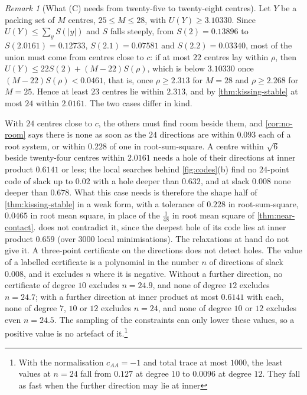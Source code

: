 \documentclass[11pt,reqno]{amsart}
\renewcommand{\_}{\origunderscore\allowbreak}
\numberwithin{equation}{section}
\theoremstyle{plain}
\theoremstyle{definition}
\theoremstyle{remark}
\newtheorem{remark}[thm]{Remark}
\begin{document}
\begin{remark}[What (C) needs from twenty-five to twenty-eight centres]\label{rem:what-c-needs}
Let $Y$ be a packing set of $M$ centres, $25\le M\le28$, with
$U(Y)\ge3.10330$. Since $U(Y)\le\sum_yS(|y|)$ and $S$ falls steeply,
from $S(2)=0.13896$ to $S(2.0161)=0.12733$, $S(2.1)=0.07581$ and
$S(2.2)=0.03340$, most of the union must come from centres close to $c$: if
at most $22$ centres lay within $\rho$, then
$U(Y)\le22S(2)+(M-22)S(\rho)$, which is below $3.10330$ once
$(M-22)S(\rho)<0.0461$, that is, once $\rho\ge2.313$ for $M=28$ and
$\rho\ge2.268$ for $M=25$. Hence at least $23$ centres lie within
$2.313$, and by \cref{thm:kissing-stable} at most $24$ within $2.0161$. The
two cases differ in kind.

With $24$ centres close to $c$, the others must find room beside them, and
\cref{cor:no-room} says there is none as soon as the $24$ directions are
within $0.093$ each of a root system, or within $0.228$ of one in
root-sum-square. A centre within $\sqrt6$ beside twenty-four centres within
$2.0161$ needs a hole of their directions at inner product $0.6141$ or less;
the local searches behind \cref{fig:codes}(b) find no $24$-point code of
slack up to $0.02$ with a hole deeper than $0.632$, and at slack $0.008$
none deeper than $0.678$. What this case needs is therefore the shape half
of \cref{thm:kissing-stable} in a weak form, with a tolerance of $0.228$ in
root-sum-square, $0.0465$ in root mean square, in place of the $\frac1{48}$
in root mean square of \cref{thm:near-contact}. 
does not contradict it, since the deepest hole of its code lies at inner
product $0.659$ (over $3000$ local minimisations). The relaxations at hand
do not give it. A three-point certificate on the directions does not detect
holes. The value of a labelled certificate is a polynomial in the number
$n$ of directions of slack $0.008$, and it excludes $n$ where it is
negative. Without a further direction, no certificate of degree $10$
excludes $n=24.9$, and none of degree $12$ excludes $n=24.7$; with a
further direction at inner product at most $0.6141$ with each, none of
degree $7$, $10$ or $12$ excludes $n=24$, and none of degree $10$ or $12$
excludes even $n=24.5$. The sampling of the constraints can only lower
these values, so a positive value is no artefact of it.\footnote{With the
  normalisation $c_{AA}=-1$ and total trace at most $1000$, the least
  values at $n=24$ fall from $0.127$ at degree $10$ to $0.0096$ at degree
  $12$. They fall as fast when the further direction may lie at inner
}
\end{remark}
\end{document}
